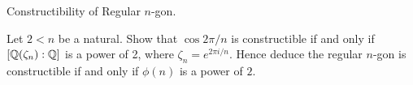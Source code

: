 \documentclass[../book.tex]{subfiles}
\begin{document}
\begin{ex} Constructibility of Regular $n$-gon.
    
    Let $2 < n$ be a natural. 
    Show that $\cos{2\pi / n}$ is constructible if and only if 
    $[\mathbb{Q}(\zeta_n) : \mathbb{Q}]$ is a power of 2, where $\zeta_n = e^{2\pi i/n}$.
    Hence deduce the regular $n$-gon is constructible if and only if 
    $\phi(n)$ is a power of $2$. 
    
\end{ex}
\end{document}

